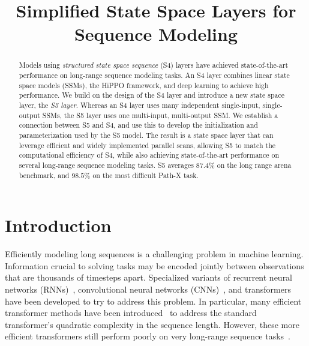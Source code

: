 \title{Simplified State Space Layers for Sequence Modeling}

\begin{abstract}
Models using \emph{structured state space sequence} (S4) layers have achieved state-of-the-art performance on long-range sequence modeling tasks. An S4 layer combines linear state space models (SSMs), the HiPPO framework, and deep learning to achieve high performance. We build on the design of the S4 layer and introduce a new state space layer, the \emph{S5 layer}.  Whereas an S4 layer uses many independent single-input, single-output SSMs, the S5 layer uses one multi-input, multi-output SSM.  We establish a connection between S5 and S4, and use this to develop the initialization and parameterization used by the S5 model.  The result is a state space layer that can leverage efficient and widely implemented parallel scans, allowing S5 to match the computational efficiency of S4, while also achieving state-of-the-art performance on several long-range sequence modeling tasks.  S5 averages $87.4\%$ on the long range arena benchmark, and $98.5\%$ on the most difficult Path-X task.
\end{abstract}

\section{Introduction}
\label{sec:intro}

Efficiently modeling long sequences is a challenging problem in machine learning.  Information crucial to solving tasks may be encoded jointly between observations that are thousands of timesteps apart. Specialized variants of recurrent neural networks (RNNs)~\citep{arjovsky2016unitary, erichson2021lipschitz, rusch2021unicornn, chang2019antisymmetricrnn}, convolutional neural networks (CNNs)~\citep{bai2018empirical, oord2016wavenet, romero2021ckconv}, and transformers~\citep{vaswani2017attention} have been developed to try to address this problem. In particular, many efficient transformer methods have been introduced~\citep{choromanski2021rethinking, katharopoulos2020transformers, Kitaev2020Reformer:, beltagy2020longformer, gupta2020gmat, wang2020linformer} to address the standard transformer's quadratic complexity in the sequence length.  However, these more efficient transformers still perform poorly on very long-range sequence tasks~\citep{tay2020lra}. 


